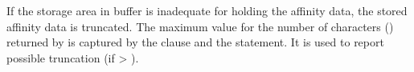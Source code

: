 If the storage area in buffer is inadequate for holding the affinity
data, the stored affinity data is truncated.  
The maximum value for the number of characters () returned by 
 is captured by the 
clause and the  statement. 
It is used to report possible truncation (if  > ).



